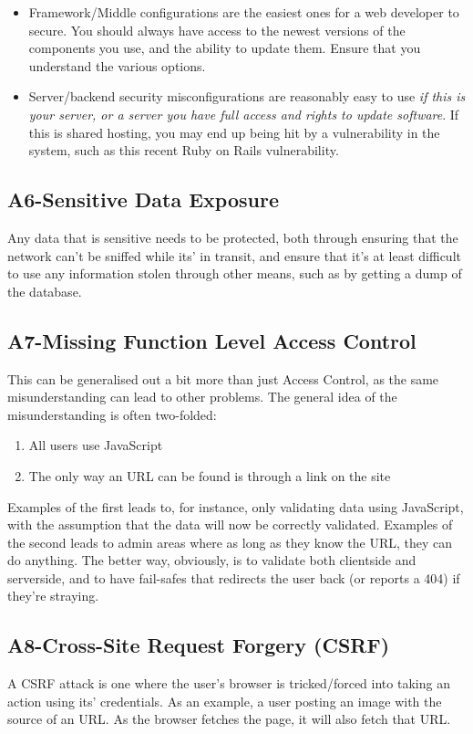 \begin{itemize}
\item Framework/Middle configurations are the easiest ones for a web developer to secure. You should always have access to the newest versions of the components you use, and the ability to update them. Ensure that you understand the various options.
\item Server/backend security misconfigurations are reasonably easy to use \emph{if this is your server, or a server you have full access and rights to update software}. If this is shared hosting, you may end up being hit by a vulnerability in the system, such as this recent Ruby on Rails vulnerability\citep{RoR2013Vuln}.
\end{itemize}

\subsection{A6-Sensitive Data Exposure}
\noindent
Any data that is sensitive needs to be protected, both through ensuring that the network can't be sniffed while its' in transit, and ensure that it's at least difficult to use any information stolen through other means, such as by getting a dump of the database.

\subsection{A7-Missing Function Level Access Control}
\noindent
This can be generalised out a bit more than just Access Control, as the same misunderstanding can lead to other problems. The general idea of the misunderstanding is often two-folded:

\begin{enumerate}
\item All users use JavaScript
\item The only way an URL can be found is through a link on the site
\end{enumerate}

Examples of the first leads to, for instance, only validating data using JavaScript, with the assumption that the data will now be correctly validated. Examples of the second leads to admin areas where as long as they know the URL, they can do anything. The better way, obviously, is to validate both clientside and serverside, and to have fail-safes that redirects the user back (or reports a 404) if they're straying.

\subsection{A8-Cross-Site Request Forgery (CSRF)}
\noindent
A CSRF attack is one where the user's browser is tricked/forced into taking an action using its' credentials. As an example, a user posting an image with the source of an URL. As the browser fetches the page, it will also fetch that URL.


